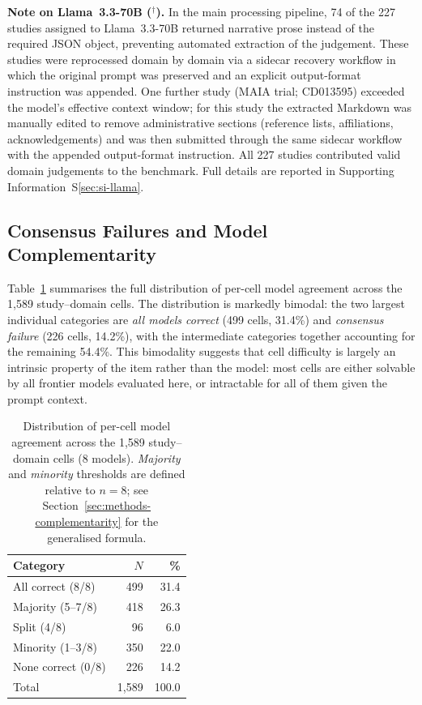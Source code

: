 \documentclass[../main.tex]{subfiles}
\begin{document}
\textbf{Note on Llama~3.3-70B ($^\dagger$).}
In the main processing pipeline, 74 of the 227 studies assigned to Llama~3.3-70B
returned narrative prose instead of the required JSON object, preventing automated
extraction of the judgement.
These studies were reprocessed domain by domain via a sidecar recovery workflow in
which the original prompt was preserved and an explicit output-format instruction
was appended.
One further study (MAIA trial; CD013595) exceeded the model's effective context
window; for this study the extracted Markdown was manually edited to remove
administrative sections (reference lists, affiliations, acknowledgements) and
was then submitted through the same sidecar workflow with the appended
output-format instruction.
All 227 studies contributed valid domain judgements to the benchmark.
Full details are reported in Supporting Information~S\ref{sec:si-llama}.

\subsection{Consensus Failures and Model Complementarity}
\label{sec:consensus-failures}

Table~\ref{tab:agreement-distribution} summarises the full distribution of
per-cell model agreement across the 1{,}589 study--domain cells.
The distribution is markedly bimodal: the two largest individual categories are
\emph{all models correct} (499 cells, 31.4\%) and \emph{consensus failure}
(226 cells, 14.2\%), with the intermediate categories together accounting for
the remaining 54.4\%.
This bimodality suggests that cell difficulty is largely an intrinsic property
of the item rather than the model: most cells are either solvable by all frontier
models evaluated here, or intractable for all of them given the prompt context.

\begin{table}[H]
\centering
\caption{Distribution of per-cell model agreement across the 1{,}589
  study--domain cells (8 models).
  \emph{Majority} and \emph{minority} thresholds are defined relative to $n = 8$;
  see Section~\ref{sec:methods-complementarity} for the generalised formula.}
\label{tab:agreement-distribution}
\begin{tabular}{lrr}
\toprule
Category & $N$ & \% \\
\midrule
All correct (8/8)  & 499     & 31.4 \\
Majority (5--7/8)  & 418     & 26.3 \\
Split (4/8)        &  96     &  6.0 \\
Minority (1--3/8)  & 350     & 22.0 \\
None correct (0/8) & 226     & 14.2 \\
\midrule
Total              & 1{,}589 & 100.0 \\
\bottomrule
\end{tabular}
\end{table}
\end{document}
